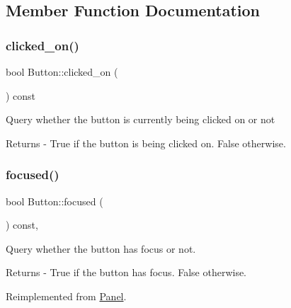 \subsection{Member Function Documentation}
\mbox{\label{class_button_a650782c10937ce67bb99aed737cd4ba1}} 
\subsubsection{\texorpdfstring{clicked\+\_\+on()}{clicked\_on()}}
{\footnotesize\ttfamily bool Button\+::clicked\+\_\+on (\begin{DoxyParamCaption}{ }\end{DoxyParamCaption}) const}

Query whether the button is currently being clicked on or not \begin{DoxyReturn}{Returns}
-\/ True if the button is being clicked on. False otherwise. 
\end{DoxyReturn}
\mbox{\label{class_button_a2c1b0adeb2920b394fe4f38354ae6604}} 
\subsubsection{\texorpdfstring{focused()}{focused()}}
{\footnotesize\ttfamily bool Button\+::focused (\begin{DoxyParamCaption}{ }\end{DoxyParamCaption}) const\hspace{0.3cm}{\ttfamily [override]}, {\ttfamily [virtual]}}

Query whether the button has focus or not. \begin{DoxyReturn}{Returns}
-\/ True if the button has focus. False otherwise. 
\end{DoxyReturn}


Reimplemented from \mbox{\hyperlink{class_panel_ace2217419ea5c2e98a38678c6e2012e1}{Panel}}.

\mbox{\label{class_button_ac2a5c2151dc48940ac2e9c5f07c8dd6a}} 
